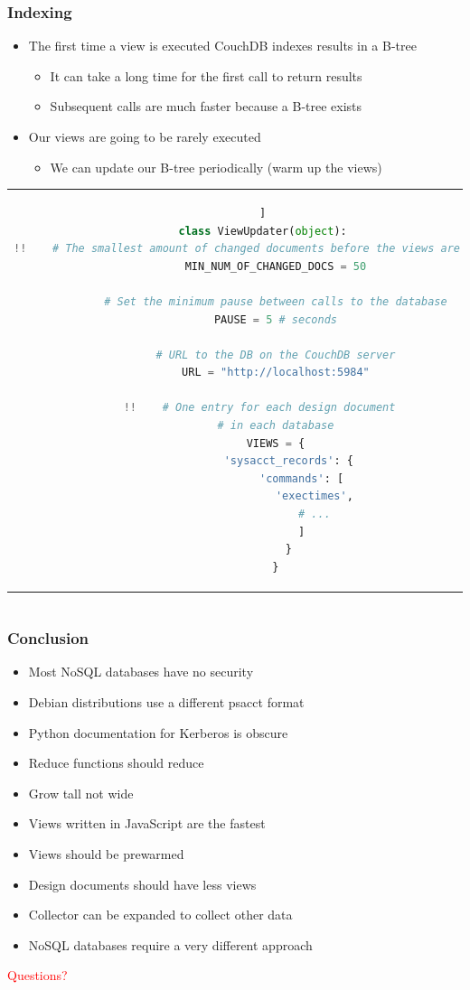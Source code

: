 \documentclass{beamer}
\begin{document}
\begin{frame}[t, fragile]
\frametitle{Indexing}
\begin{itemize}
\item The first time a view is executed CouchDB indexes results in a B-tree
\begin{itemize}
	\item It can take a long time for the first call to return results
	\item Subsequent calls are much faster because a B-tree exists
\end{itemize}
\item Our views are going to be rarely executed
\begin{itemize}
	\item We can update our B-tree periodically (warm up the views)
\end{itemize}
\end{itemize}
{ \tiny
\begin{center}
\begin{tabular}{c}
\begin{lstlisting}[language=Python, escapechar=!]]
class ViewUpdater(object):
!!    # The smallest amount of changed documents before the views are updated
    MIN_NUM_OF_CHANGED_DOCS = 50
    
    # Set the minimum pause between calls to the database
    PAUSE = 5 # seconds
    
    # URL to the DB on the CouchDB server
    URL = "http://localhost:5984"
    
!!    # One entry for each design document 
    # in each database
    VIEWS = {
        'sysacct_records': {
            'commands': [
                'exectimes',
                # ...
            ]
        }
    }
\end{lstlisting}
\end{tabular}
\end{center}
}
\end{frame}

\section*{}
\begin{frame}[t]
\frametitle{Conclusion}
\begin{itemize}
\item Most NoSQL databases have no security
\item Debian distributions use a different psacct format
\item Python documentation for Kerberos is obscure
\item Reduce functions should reduce
\item Grow tall not wide
\item Views written in JavaScript are the fastest
\item Views should be prewarmed
\item Design documents should have less views
\item Collector can be expanded to collect other data
\item NoSQL databases require a very different approach
\end{itemize}
\end{frame}

\begin{frame}
\begin{center}
\LARGE \textcolor{red}{Questions?}
\end{center}
\end{frame}
\end{document}
